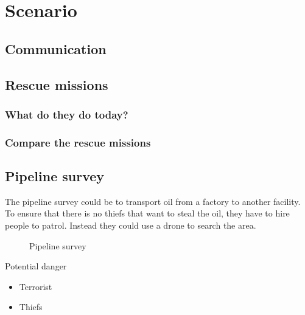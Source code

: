 \chapter{Scenario}\label{ch:scenario}

\section{Communication}

\section{Rescue missions}
\subsection{What do they do today?}
\subsection{Compare the rescue missions}

\section{Pipeline survey}
The pipeline survey could be to transport oil from a factory to another facility. To ensure that there is no thiefs that want to steal the oil, they have to hire people to patrol. Instead they could use a drone to search the area.
\begin{figure}[hb]
  \centering
  \caption[Pipeline survey]
   {Pipeline survey}
\end{figure}
Potential danger
\begin{itemize}
\item Terrorist
\item Thiefs
\end{itemize}